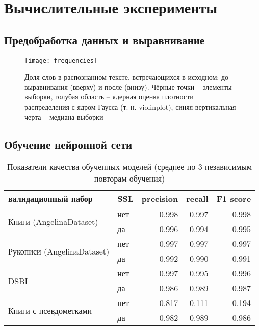 \documentclass{main.tex}[subfiles]
\begin{document}
\section{Вычислительные эксперименты}
\subsection{Предобработка данных и выравнивание}

\begin{figure}[H]
    \centering
    \texttt{[image: frequencies]}
    \caption{Доля слов в распознанном тексте, встречающихся в исходном: до выравнивания (вверху) и после (внизу). Чёрные точки -- элементы выборки, голубая область -- ядерная оценка плотности распределения с ядром Гаусса (т. н. violinplot), синяя вертикальная черта -- медиана выборки}
    \label{fig:frequencies} %
\end{figure}

\subsection{Обучение нейронной сети}

\begin{table}[ht]
    \centering
    \caption{Показатели качества обученных моделей (среднее по 3 независимым повторам обучения)}
    \begin{tabular}{llrrr}
        \hline
        валидационный набор & SSL & precision & recall & F1 score \\
        \hline
        \multirow{2}{*}{ Книги (AngelinaDataset) }
         & нет & 0.998 & 0.997 & 0.998 \\
         & да  & 0.996 & 0.994 & 0.995 \\
        \multirow{2}{*}{ Рукописи (AngelinaDataset) }
         & нет & 0.997 & 0.997 & 0.997 \\
         & да  & 0.992 & 0.990 & 0.991 \\
        \multirow{2}{*}{ DSBI }
         & нет & 0.997 & 0.995 & 0.996 \\
         & да & 0.986 & 0.989 & 0.987 \\
        \multirow{2}{*}{ Книги с псевдометками }
         & нет & 0.817 & 0.111 & 0.194 \\
         & да & 0.982 & 0.989 & 0.986 \\
        \hline
    \end{tabular}
    \label{table:validate_results} %
\end{table}
\end{document}
